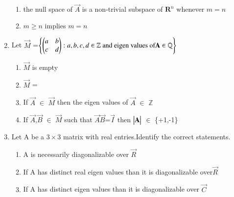 \begin{enumerate}[label=\thesection.\arabic*.,ref=\thesection.\theenumi]
\begin{enumerate}
		\item the null space of $\vec{A}$ is a non-trivial subspace of $\mathbf{R}^{n}$ whenever $m=n$
		\item $m\geq n$ implies $m=n$
	\end{enumerate}
%
\solution

\item Let $\vec{M}$ =$\left\{\begin{pmatrix}a&b\\c&d\end{pmatrix} : a,b,c,d \in \mathbb{Z} \text{ and eigen values of} \mathbf{A} \in \mathbb{Q}\right\}$ \label{main}
\begin{enumerate}
    \item $\vec{M}$ is empty
    \item $\vec{M}$ =
    \item If $\vec{A}$ $\in$ $\vec{M}$ then the eigen values of $\vec{A}$ $\in$ $\mathbb{Z}$
    \item If $\vec{A}$,$\vec{B}$ $\in$ $\vec{M}$ such that $\vec{A} \vec{B}$=$\vec{I}$ then $\begin{vmatrix}\mathbf{A}\end{vmatrix}$ $\in$ \{+1,-1\}
\end{enumerate}
%
\solution

%
\item Let A be a $3\times 3$  matrix  with real entries.Identify  the correct statements.
\begin{enumerate}

\item A  is necessarily diagonalizable over $\vec{R}$

\item If A has distinct real  eigen values than  it is diagonalizable over$\vec{R}$

\item If A has distinct eigen values than  it is diagonalizable over $\vec{C}$


\end{enumerate}
\end{enumerate}
